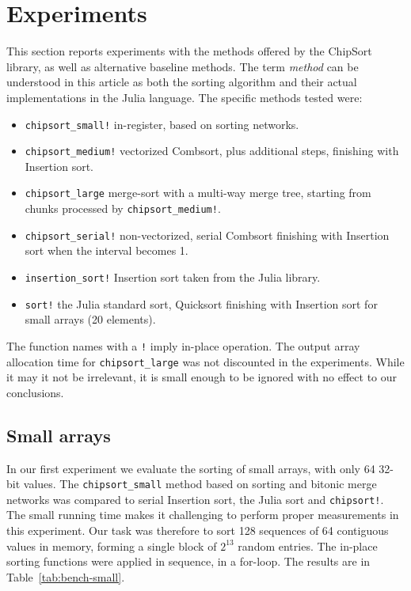 \documentclass{juliacon}
\begin{document}
\section{Experiments}
\label{sec:experiments}
%
This section reports experiments with the methods offered by the ChipSort library, as well as alternative baseline methods. The term {\it method} can be understood in this article as both the sorting algorithm and their actual implementations in the Julia language. The specific methods tested were:
\begin{itemize}
\item {\tt chipsort\_small!} in-register, based on sorting networks.
\item {\tt chipsort\_medium!} vectorized Combsort, plus additional steps, finishing with Insertion sort.
\item {\tt chipsort\_large} merge-sort with a multi-way merge tree, starting from chunks processed by {\tt chipsort\_medium!}.
\item {\tt chipsort\_serial!} non-vectorized, serial Combsort finishing with Insertion sort when the interval becomes 1.
\item {\tt insertion\_sort!} Insertion sort taken from the Julia library.
\item {\tt sort!} the Julia standard sort, Quicksort finishing with Insertion sort for small arrays (20 elements).
\end{itemize}

The function names with a {\tt !} imply in-place operation. The output array allocation time for {\tt chipsort\_large} was not discounted in the experiments. While it may it not be irrelevant, it is small enough to be ignored with no effect to our conclusions.

\subsection{Small arrays}
In our first experiment we evaluate the sorting of small arrays, with only 64 32-bit values. The {\tt chipsort\_small} method based on sorting and bitonic merge networks was compared to serial Insertion sort, the Julia sort and {\tt chipsort!}. The small running time makes it challenging to perform proper measurements in this experiment. Our task was therefore to sort 128 sequences of 64 contiguous values in memory, forming a single block of $2^{13}$ random entries. The in-place sorting functions were applied in sequence, in a for-loop. The results are in Table~\ref{tab:bench-small}.
\end{document}
